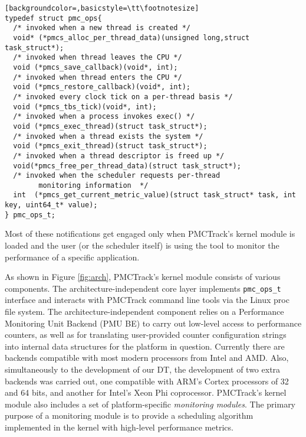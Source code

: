 \begin{lstlisting}[backgroundcolor=,basicstyle=\tt\footnotesize]
typedef struct pmc_ops{
  /* invoked when a new thread is created */
  void* (*pmcs_alloc_per_thread_data)(unsigned long,struct task_struct*);
  /* invoked when thread leaves the CPU */
  void (*pmcs_save_callback)(void*, int);
  /* invoked when thread enters the CPU */
  void (*pmcs_restore_callback)(void*, int);
  /* invoked every clock tick on a per-thread basis */
  void (*pmcs_tbs_tick)(void*, int);
  /* invoked when a process invokes exec() */
  void (*pmcs_exec_thread)(struct task_struct*);
  /* invoked when a thread exists the system */
  void (*pmcs_exit_thread)(struct task_struct*);
  /* invoked when a thread descriptor is freed up */
  void(*pmcs_free_per_thread_data)(struct task_struct*);
  /* invoked when the scheduler requests per-thread
        monitoring information  */
  int  (*pmcs_get_current_metric_value)(struct task_struct* task, int key, uint64_t* value);
} pmc_ops_t;
\end{lstlisting}


Most of these notifications get engaged only when PMCTrack's kernel
module is loaded and the user (or the scheduler itself) is using the
tool to monitor the performance of a specific application.

As shown in Figure \ref{fig:arch}, PMCTrack's kernel module consists of
various components. The architecture-independent core layer implements
\texttt{pmc\_ops\_t} interface and interacts with PMCTrack command line
tools via the Linux proc file system. The architecture-independent
component relies on a Performance Monitoring Unit Backend (PMU BE) to
carry out low-level access to performance counters, as well as for
translating user-provided counter configuration strings into internal
data structures for the platform in question. Currently there are
backends compatible with most modern processors from Intel and AMD.
Also, simultaneously to the development of our DT, the development of
two extra backends was carried out, one compatible with ARM's Cortex
processors of 32 and 64 bits, and another for Intel's Xeon Phi
coprocessor. PMCTrack's kernel module also includes a set of
platform-specific \textit{monitoring modules}. The primary purpose of a
monitoring module is to provide a scheduling algorithm implemented in
the kernel with high-level performance metrics.


